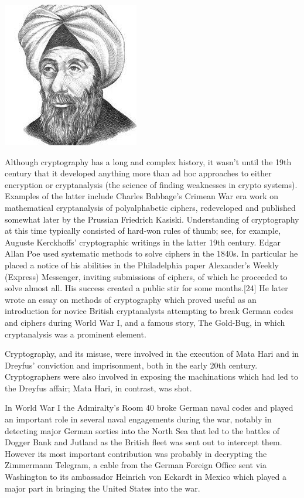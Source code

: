\documentclass{report}
\begin{document}
{{\begin{center}

\includegraphics[scale=0.6]{"al_kindi.png"}
\end{center}


\Large{Although cryptography has a long and complex history, it wasn't until the 19th century that it developed anything more than ad hoc approaches to either encryption or cryptanalysis (the science of finding weaknesses in crypto systems). Examples of the latter include Charles Babbage's Crimean War era work on mathematical cryptanalysis of polyalphabetic ciphers, redeveloped and published somewhat later by the Prussian Friedrich Kasiski. Understanding of cryptography at this time typically consisted of hard-won rules of thumb; see, for example, Auguste Kerckhoffs' cryptographic writings in the latter 19th century. Edgar Allan Poe used systematic methods to solve ciphers in the 1840s. In particular he placed a notice of his abilities in the Philadelphia paper Alexander's Weekly (Express) Messenger, inviting submissions of ciphers, of which he proceeded to solve almost all. His success created a public stir for some months.[24] He later wrote an essay on methods of cryptography which proved useful as an introduction for novice British cryptanalysts attempting to break German codes and ciphers during World War I, and a famous story, The Gold-Bug, in which cryptanalysis was a prominent element.

Cryptography, and its misuse, were involved in the execution of Mata Hari and in Dreyfus' conviction and imprisonment, both in the early 20th century. Cryptographers were also involved in exposing the machinations which had led to the Dreyfus affair; Mata Hari, in contrast, was shot.

In World War I the Admiralty's Room 40 broke German naval codes and played an important role in several naval engagements during the war, notably in detecting major German sorties into the North Sea that led to the battles of Dogger Bank and Jutland as the British fleet was sent out to intercept them. However its most important contribution was probably in decrypting the Zimmermann Telegram, a cable from the German Foreign Office sent via Washington to its ambassador Heinrich von Eckardt in Mexico which played a major part in bringing the United States into the war.

}}}
\end{document}
